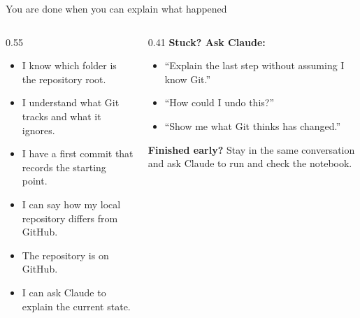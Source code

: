 \begin{frame}{You are done when you can explain what happened}
  \vfill
  \begin{columns}[c]
    \begin{column}{0.55\textwidth}
      \begin{itemize}\small\setlength\itemsep{0.55em}
        \item I know which folder is the repository root.
        \item I understand what Git tracks and what it ignores.
        \item I have a first commit that records the starting point.
        \item I can say how my local repository differs from GitHub.
        \item The repository is on GitHub.
        \item I can ask Claude to explain the current state.
      \end{itemize}
    \end{column}
    \begin{column}{0.41\textwidth}
      \textbf{Stuck? Ask Claude:}
      \begin{itemize}\small\setlength\itemsep{0.45em}
        \item ``Explain the last step without assuming I know Git.''
        \item ``How could I undo this?''
        \item ``Show me what Git thinks has changed.''
      \end{itemize}
      \vspace{0.6em}
      {\small\textbf{Finished early?} Stay in the same conversation and ask Claude to run and check the notebook.}
    \end{column}
  \end{columns}
  \vspace{1.6cm plus 1fill}
\end{frame}
